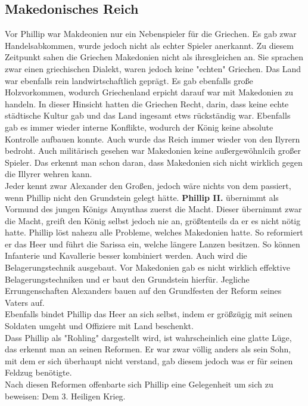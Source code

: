 \documentclass{article}
\begin{document}
	\subsection{Makedonisches Reich}
	Vor Phillip war Makdeonien nur ein Nebenspieler für die Griechen. Es gab zwar Handelsabkommen, wurde jedoch nicht als echter Spieler anerkannt. Zu diesem Zeitpunkt sahen die Griechen Makedonien nicht als ihresgleichen an. Sie sprachen zwar einen griechischen Dialekt, waren jedoch keine "echten" Griechen. Das Land war ebenfalls rein landwirtschaftlich geprägt. Es gab ebenfalls große Holzvorkommen, wodurch Griechenland erpicht darauf war mit Makedonien zu handeln. In dieser Hinsicht hatten die Griechen Recht, darin, dass keine echte städtische Kultur gab und das Land ingesamt etws rückständig war. Ebenfalls gab es immer wieder interne Konflikte, wodurch der König keine absolute Kontrolle aufbauen konnte. Auch wurde das Reich immer wieder von den Ilyrern bedroht. Auch militärisch gesehen war Makedonien keine außergewöhnlcih großer Spieler. Das erkennt man schon daran, dass Makedonien sich nicht wirklich gegen die Illyrer wehren kann. \\
	Jeder kennt zwar Alexander den Großen, jedoch wäre nichts von dem passiert, wenn Phillip nicht den Grundstein gelegt hätte.
	\textbf{Phillip II.} übernimmt als Vormund des jungen Königs Amynthas zuerst die Macht. Dieser übernimmt zwar die Macht, greift den König selbst jedoch nie an, größtenteils da er es nicht nötig hatte. Phillip löst nahezu alle Probleme, welches Makedonien hatte. So reformiert er das Heer und führt die Sarissa ein, welche längere Lanzen besitzen. So können Infanterie und Kavallerie besser kombiniert werden. Auch wird die Belagerungstechnik ausgebaut. Vor Makedonien gab es nicht wirklich effektive Belagerungstechniken und er baut den Grundstein hierfür. Jegliche Errungenschaften Alexanders bauen auf den Grundfesten der Reform seines Vaters auf. \\
	Ebenfalls bindet Phillip das Heer an sich selbst, indem er größzügig mit seinen Soldaten umgeht und Offiziere mit Land beschenkt. \\
	Dass Phillip als "Rohling" dargestellt wird, ist wahrscheinlich eine glatte Lüge, das erkennt man an seinen Reformen. Er war zwar völlig anders als sein Sohn, mit dem er sich überhaupt nicht verstand, gab diesem jedoch was er für seinen Feldzug benötigte. \\
	Nach diesen Reformen offenbarte sich Phillip eine Gelegenheit um sich zu beweisen: Dem 3. Heiligen Krieg. \\
\end{document}
